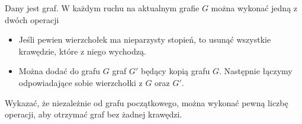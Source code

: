 
\noindent
Dany jest graf. W każdym ruchu na aktualnym grafie $G$ można wykonać jedną z dwóch operacji

\begin{itemize}

\item Jeśli pewien wierzchołek ma nieparzysty stopień, to usunąć wszystkie krawędzie, które z niego wychodzą.


\item Można dodać do grafu $G$ graf $G'$ będący kopią grafu $G$. Następnie łączymy odpowiadające sobie wierzchołki z $G$ oraz $G'$. 
\end{itemize}

\noindent
Wykazać, że niezależnie od grafu początkowego, można wykonać pewną liczbę operacji, aby otrzymać graf bez żadnej krawędzi.

\vspace{5px}


